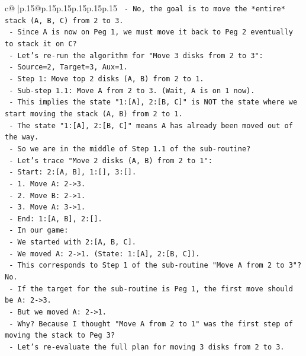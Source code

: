 \documentclass{article}
\begin{document}
{\begin{supertabular}{c@{$\;$}|p{.15\linewidth}@{}p{.15\linewidth}p{.15\linewidth}p{.15\linewidth}p{.15\linewidth}p{.15\linewidth}}
{{{\texttt{   {-} No, the goal is to move the *entire* stack (A, B, C) from 2 to 3.} \\
\texttt{   {-} Since A is now on Peg 1, we must move it back to Peg 2 eventually to stack it on C?} \\
\texttt{   {-} Let's re{-}run the algorithm for "Move 3 disks from 2 to 3":} \\
\texttt{     {-} Source=2, Target=3, Aux=1.} \\
\texttt{     {-} Step 1: Move top 2 disks (A, B) from 2 to 1.} \\
\texttt{       {-} Sub{-}step 1.1: Move A from 2 to 3. (Wait, A is on 1 now).} \\
\texttt{       {-} This implies the state "1:{[}A{]}, 2:{[}B, C{]}" is NOT the state where we start moving the stack (A, B) from 2 to 1.} \\
\texttt{       {-} The state "1:{[}A{]}, 2:{[}B, C{]}" means A has already been moved out of the way.} \\
\texttt{       {-} So we are in the middle of Step 1.1 of the sub{-}routine?} \\
\texttt{       {-} Let's trace "Move 2 disks (A, B) from 2 to 1":} \\
\texttt{         {-} Start: 2:{[}A, B{]}, 1:{[}{]}, 3:{[}{]}.} \\
\texttt{         {-} 1. Move A: 2{-}>3.} \\
\texttt{         {-} 2. Move B: 2{-}>1.} \\
\texttt{         {-} 3. Move A: 3{-}>1.} \\
\texttt{         {-} End: 1:{[}A, B{]}, 2:{[}{]}.} \\
\texttt{       {-} In our game:} \\
\texttt{         {-} We started with 2:{[}A, B, C{]}.} \\
\texttt{         {-} We moved A: 2{-}>1. (State: 1:{[}A{]}, 2:{[}B, C{]}).} \\
\texttt{         {-} This corresponds to Step 1 of the sub{-}routine "Move A from 2 to 3"? No.} \\
\texttt{         {-} If the target for the sub{-}routine is Peg 1, the first move should be A: 2{-}>3.} \\
\texttt{         {-} But we moved A: 2{-}>1.} \\
\texttt{         {-} Why? Because I thought "Move A from 2 to 1" was the first step of moving the stack to Peg 3?} \\
\texttt{         {-} Let's re{-}evaluate the full plan for moving 3 disks from 2 to 3.} \\
}}}
\end{supertabular}}
\end{document}
